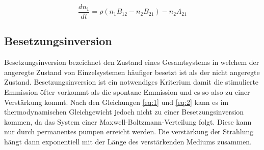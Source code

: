 \begin{equation}
    \label{eq:2}
    \frac{dn_1}{dt}=\rho(n_1B_{12}-n_2B_{21})-n_2A_{21}
\end{equation}


\subsection{Besetzungsinversion}
\label{sec:Besetzungsinversion}
Besetzungsinversion bezeichnet den Zustand eines Gesamtsystems in welchem der angeregte Zustand von 
Einzelsystemen häufiger besetzt ist als der nicht angeregte Zustand. Besetzungsinversion ist ein notwendiges
Kriterium damit die stimulierte Emmission öfter vorkommt als die spontane Emmission und es so also zu einer
Verstärkung kommt. Nach den Gleichungen \autoref{eq:1} und \autoref{eq:2} kann es im thermodynamischen
Gleichgewicht jedoch nicht zu einer Besetzungsinversion kommen, da das System einer Maxwell-Boltzmann-Verteilung 
folgt. Diese kann nur durch permanentes pumpen erreicht werden. Die verstärkung der Strahlung hängt dann
exponentiell mit der Länge des verstärkenden Mediums zusammen.

